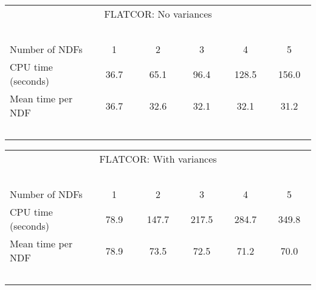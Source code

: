 \begin{center}
   \begin{tabular}{|l||c|c|c|c|c|}
   \multicolumn{6}{c}{FLATCOR: No variances} \\
   \multicolumn{6}{l}{~~~}
   \\ \hline
   Number of NDFs    & ~~~1~~~ & ~~~2~~~ & ~~~3~~~ & ~~~4~~~ & ~~~5~~~
    \\ \hline
   CPU time (seconds)&  36.7   & 65.1   & 96.4   & 128.5  & 156.0
    \\ \hline
   Mean time per NDF &  36.7   & 32.6   & 32.1   & 32.1   & 31.2
    \\ \hline
   \multicolumn{6}{l}{~~~}
   \\
   \end{tabular}
   \begin{tabular}{|l||c|c|c|c|c|}
   \multicolumn{6}{c}{FLATCOR: With variances} \\
   \multicolumn{6}{l}{~~~}
   \\ \hline
   Number of NDFs    & ~~~1~~~ & ~~~2~~~ & ~~~3~~~ & ~~~4~~~ & ~~~5~~~
    \\ \hline
   CPU time (seconds)&  78.9   & 147.7  & 217.5   & 284.7   & 349.8
    \\ \hline
   Mean time per NDF &  78.9   &  73.5  & 72.5    & 71.2   & 70.0
    \\ \hline
   \multicolumn{6}{l}{~~~}
   \\
   \end{tabular}
\end{center}

